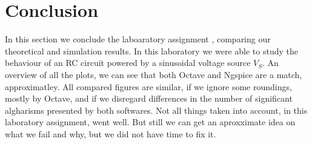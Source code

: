 \section{Conclusion}
\label{sec:conclusion}


In this section we conclude the laboaratory assignment , comparing our theoretical and simulation results. 
In this laboratory we were able to study the behaviour of an RC circuit powered by a sinusoidal voltage source $V_S$.
An overview of all the plots, we can see that both Octave and Ngspice are a match, approximatley.
All compared figures are similar, if we ignore some roundings, mostly by Octave, and if we disregard differences in the number of significant algharisms presented by both softwares. 
Not all things taken into account, in this laboratory assignment, went well. But still we can get an aproxximate idea on what we fail and why, but we did not have time to fix it. 

